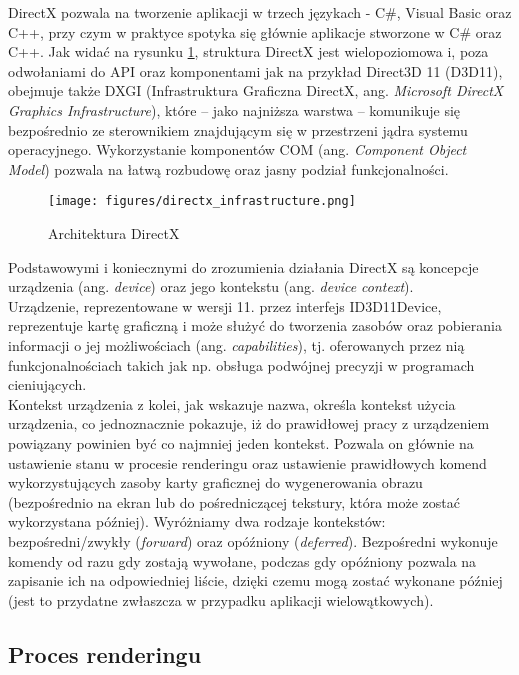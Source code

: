 DirectX pozwala na tworzenie aplikacji w trzech językach - C\#, Visual Basic oraz C++, przy czym w praktyce spotyka się głównie aplikacje stworzone w C\# oraz C++.
Jak widać na rysunku \ref{directx_infrastructure}, struktura DirectX jest wielopoziomowa i, poza odwołaniami do API oraz komponentami jak na przykład Direct3D 11 (D3D11), obejmuje także DXGI (Infrastruktura Graficzna DirectX, ang. \emph{Microsoft DirectX Graphics Infrastructure}), które -- jako najniższa warstwa -- komunikuje się bezpośrednio ze sterownikiem znajdującym się w przestrzeni jądra systemu operacyjnego. Wykorzystanie komponentów COM (ang. \emph{Component Object Model}) pozwala na łatwą rozbudowę oraz jasny podział funkcjonalności.\\
\begin{figure}
\begin{center}
\texttt{[image: figures/directx\_infrastructure.png]}
\caption{Architektura DirectX}
\label{directx_infrastructure}
\end{center}
\end{figure}
Podstawowymi i koniecznymi do zrozumienia działania DirectX są koncepcje urządzenia (ang. \emph{device}) oraz jego kontekstu (ang. \emph{device context}).\\
Urządzenie, reprezentowane w wersji 11. przez interfejs ID3D11Device, reprezentuje kartę graficzną i może służyć do tworzenia zasobów oraz pobierania informacji o jej możliwościach (ang. \emph{capabilities}), tj. oferowanych przez nią funkcjonalnościach takich jak np. obsługa podwójnej precyzji w programach cieniujących.\\
Kontekst urządzenia z kolei, jak wskazuje nazwa, określa kontekst użycia urządzenia, co jednoznacznie pokazuje, iż do prawidłowej pracy z urządzeniem powiązany powinien być co najmniej jeden kontekst. Pozwala on głównie na ustawienie stanu w procesie renderingu oraz ustawienie prawidłowych komend wykorzystujących zasoby karty graficznej do wygenerowania obrazu (bezpośrednio na ekran lub do pośredniczącej tekstury, która może zostać wykorzystana później). Wyróżniamy dwa rodzaje kontekstów: bezpośredni/zwykły (\emph{forward}) oraz opóźniony (\emph{deferred}). Bezpośredni wykonuje komendy od razu gdy zostają wywołane, podczas gdy opóźniony pozwala na zapisanie ich na odpowiedniej liście, dzięki czemu mogą zostać wykonane później (jest to przydatne zwłaszcza w przypadku aplikacji wielowątkowych).\\

\subsection{Proces renderingu}

